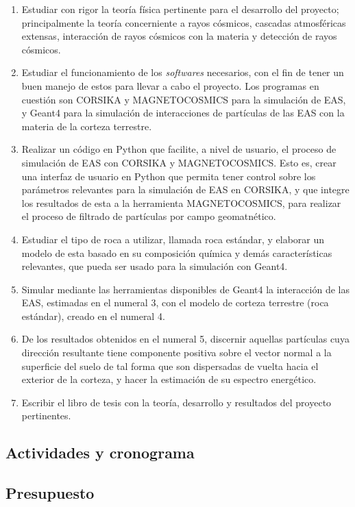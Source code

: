 \documentclass[12pt]{report}
\begin{document}
\begin{enumerate}
    \item Estudiar con rigor la teoría física pertinente para el desarrollo del proyecto; principalmente la teoría concerniente a rayos cósmicos, cascadas atmosféricas extensas, interacción de rayos cósmicos con la materia y detección de rayos cósmicos.
    \item Estudiar el funcionamiento de los \textit{softwares} necesarios, con el fin de tener un buen manejo de estos para llevar a cabo el proyecto. Los programas en cuestión son CORSIKA y MAGNETOCOSMICS para la simulación de EAS, y Geant4 para la simulación de interacciones de partículas de las EAS con la materia de la corteza terrestre.
    \item Realizar un código en Python que facilite, a nivel de usuario, el proceso de simulación de EAS con CORSIKA y MAGNETOCOSMICS. Esto es, crear una interfaz de usuario en Python que permita tener control sobre los parámetros relevantes para la simulación de EAS en CORSIKA, y que integre los resultados de esta a la herramienta MAGNETOCOSMICS, para realizar el proceso de filtrado de partículas por campo geomatnético.
    \item Estudiar el tipo de roca a utilizar, llamada roca estándar, y elaborar un modelo de esta basado en su composición química y demás características relevantes, que pueda ser usado para la simulación con Geant4.
    \item Simular mediante las herramientas disponibles de Geant4 la interacción de las EAS, estimadas en el numeral 3, con el modelo de corteza terrestre (roca estándar), creado en el numeral 4.
    \item De los resultados obtenidos en el numeral 5, discernir aquellas partículas cuya dirección resultante tiene componente positiva sobre el vector normal a la superficie del suelo de tal forma que son dispersadas de vuelta hacia el exterior de la corteza, y hacer la estimación de su espectro energético.
    \item Escribir el libro de tesis con la teoría, desarrollo y resultados del proyecto pertinentes.
\end{enumerate}

\subsection*{Actividades y cronograma}

\subsection*{Presupuesto}




\printbibliography
\end{document}
